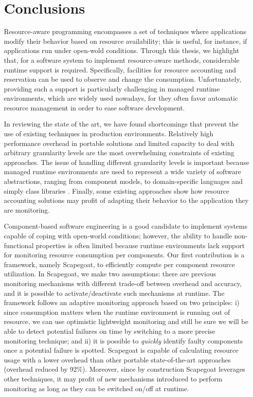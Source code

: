 \section{Conclusions} \label{sec:thesis-conclusions}

Resource-aware programming encompasses a set of techniques where applications modify their behavior based on resource availability;
this is useful, for instance, if applications run under open-wold conditions.
Through this thesis, we highlight that, for a software system to implement resource-aware methods, considerable runtime support is required.
Specifically, facilities for resource accounting and reservation can be used to observe and change the consumption.
Unfortunately, providing such a support is particularly challenging in managed runtime environments, which are widely used nowadays, for they often favor automatic resource management in order to ease software development.

In reviewing the state of the art, we have found shortcomings that prevent the use of existing techniques in production environments.
Relatively high performance overhead in portable solutions and limited capacity to deal with arbitrary granularity levels are the most overwhelming constraints of existing approaches.
The issue of handling different granularity levels is important because managed runtime environments are used to represent a wide variety of software abstractions, ranging from component models, to domain-specific languages and simply class libraries .
Finally, some existing approaches show how resource accounting solutions may profit of adapting their behavior to the application they are monitoring.

Component-based software engineering is a good candidate to implement systems capable of coping with open-world conditions; however, the ability to handle non-functional properties is often limited because runtime environments lack support for monitoring resource consumption per components.
Our first contribution is a framework, namely Scapegoat, to efficiently compute per component resource utilization.
In Scapegoat, we make two assumptions: there are previous monitoring mechanisms with different trade-off between overhead and accuracy, and
it is possible to activate/deactivate such mechanisms at runtime.
The framework follows an adaptive monitoring approach based on two principles: i) since consumption matters when the runtime environment is running out
of resource, we can use optimistic lightweight monitoring and still be sure we will be able to detect potential failures on time by switching to a more precise monitoring technique; and ii) it is possible to \textit{quickly} identify faulty components once a potential failure is spotted.
Scapegoat is capable of calculating resource usage with a lower overhead than other portable state-of-the-art approaches (overhead reduced by 92\%).
Moreover, since by construction Scapegoat leverages other techniques, it may profit of new mechanisms introduced to perform monitoring as long as they can be switched on/off at runtime.   

